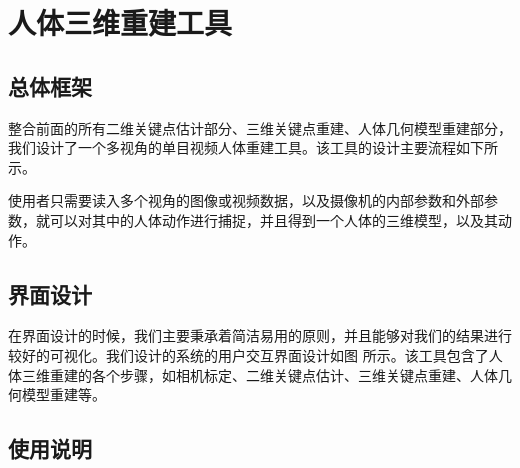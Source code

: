 \section{人体三维重建工具}

\subsection{总体框架}
整合前面的所有二维关键点估计部分、三维关键点重建、人体几何模型重建部分，我们设计了一个多视角的单目视频人体重建工具。该工具的设计主要流程如下所示。

使用者只需要读入多个视角的图像或视频数据，以及摄像机的内部参数和外部参数，就可以对其中的人体动作进行捕捉，并且得到一个人体的三维模型，以及其动作。

\subsection{界面设计}
在界面设计的时候，我们主要秉承着简洁易用的原则，并且能够对我们的结果进行较好的可视化。我们设计的系统的用户交互界面设计如图 所示。该工具包含了人体三维重建的各个步骤，如相机标定、二维关键点估计、三维关键点重建、人体几何模型重建等。

\subsection{使用说明}
